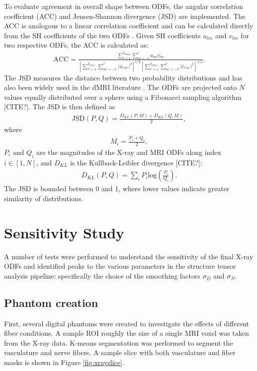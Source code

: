 \documentclass[11pt]{article}
\begin{document}
To evaluate agreement in overall shape between ODFs, the angular correlation coefficient
(ACC) and Jensen-Shannon divergence (JSD) are implemented. The ACC is analogous to
a linear correlation coefficient and can be calculated directly from the SH
coefficients of the two ODFs \cite{Anderson2005}. Given SH coefficients $u_{lm}$ and $v_{lm}$ for
two respective ODFs, the ACC is calculated as:
\begin{align}
  \text{ACC} = \frac{\sum\limits_{l=1}^{L_{max}}\sum\limits_{m=-l}^l u_{lm}\bar{v}_{lm}}{\left[\sum\limits_{l'=1}^{L_{max}}\sum\limits_{m'=-l'}^{l'}|u_{l'm'}|^2\right]^{1/2}\left[\sum\limits_{l'=1}^{L_{max}}\sum\limits_{m'=-l'}^{l'}|\bar{v}_{l'm'}|^2\right]^{1/2}}.
\end{align}
The JSD measures the distance between two probability distributions and has also
been widely used in the dMRI literature \cite{Cohen-Adad2011}. The ODFs are projected onto
$N$ values equally distributed over a sphere using a Fibonacci sampling algorithm [CITE?].
The JSD is then defined as
\begin{align}
  \text{JSD}(P, Q) = \frac{D_{KL}(P, M) + D_{KL}(Q, M)}{2},
\end{align}
where
\begin{align}
  M_i = \frac{P_i + Q_i}{2},
\end{align}
$P_i$ and $Q_i$ are the magnitudes of the X-ray and MRI ODFs along index
$i \in [1, N]$, and $D_{KL}$ is the Kullback-Leibler divergence [CITE?]:
\begin{align}
  D_{KL}(P, Q) = \sum_i P_i\text{log}\left(\frac{P_i}{Q_i}\right).
\end{align}
The JSD is bounded between 0 and 1, where lower values indicate greater
similarity of distributions.

\section{Sensitivity Study}
A number of tests were performed to understand the sensitivity of the final
X-ray ODFs and identified peaks to the various parameters in the structure
tensor analysis pipeline: specifically the choice of the smoothing factors
$\sigma_D$ and $\sigma_N$. 

\subsection{Phantom creation}

First, several digital phantoms were created to investigate the effects of
different fiber conditions. A sample ROI roughly the size of a single MRI voxel
was taken from the X-ray data. K-means segmentation was performed to segment the
vasculature and nerve fibers. A sample slice with both vasculature and fiber
masks is shown in Figure \ref{fig:xrayslice}.
\end{document}
